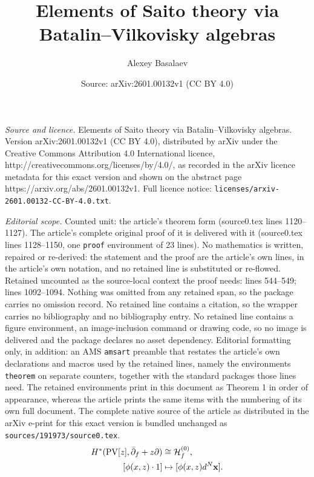 \documentclass[10pt,a4paper]{amsart}
\title{Elements of Saito theory via Batalin--Vilkovisky algebras}
\author{Alexey Basalaev}
\date{Source: arXiv:2601.00132v1 (CC BY 4.0)}
\def\H{{\mathcal H}}
\newcommand{\PV}{{\mathrm{PV}}}
\newcommand{\bx}{{\bf x}}
\newcommand{\p}{{\partial}}
\begin{document}
\maketitle

\noindent\emph{Source and licence.} Elements of Saito theory via Batalin--Vilkovisky algebras. Version arXiv:2601.00132v1 (CC BY 4.0), distributed by arXiv under the Creative Commons Attribution 4.0 International licence, http://creativecommons.org/licenses/by/4.0/, as recorded in the arXiv licence metadata for this exact version and shown on the abstract page https://arxiv.org/abs/2601.00132v1. Full licence notice: \texttt{licenses/arxiv-2601.00132-CC-BY-4.0.txt}.\par\smallskip

\noindent\textit{Editorial scope.} Counted unit: the article's theorem form (source0.tex lines 1120--1127). The article's complete original proof of it is delivered with it (source0.tex lines 1128--1150, one \texttt{proof} environment of 23 lines). No mathematics is written, repaired or re-derived: the statement and the proof are the article's own lines, in the article's own notation, and no retained line is substituted or re-flowed.  Retained uncounted as the source-local context the proof needs: lines 544--549; lines 1092--1094.  Nothing was omitted from any retained span, so the package carries no omission record.  No retained line contains a citation, so the wrapper carries no bibliography and no bibliography entry.  No retained line contains a figure environment, an image-inclusion command or drawing code, so no image is delivered and the package declares no asset dependency.  Editorial formatting only, in addition: an AMS \texttt{amsart} preamble that restates the article's own declarations and macros used by the retained lines, namely the environments \texttt{theorem} on separate counters, together with the standard packages those lines need.  The retained environments print in this document as Theorem 1 in order of appearance, whereas the article prints the same items with the numbering of its own full document.  The complete native source of the article as distributed in the arXiv e-print for this exact version is bundled unchanged as \texttt{sources/191973/source0.tex}.
\begin{align}\label{eq: preBL as cohomology}
    H^\ast(\PV [z], \bar \p_f + z\p) & \cong \H_f^{(0)},
    \\
\notag
    [\phi(x,z) \cdot 1] & \mapsto [\phi(x,z) d^N\bx].
\end{align}
\end{document}
